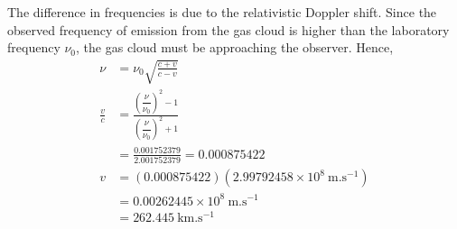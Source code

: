 The difference in frequencies is due to the relativistic Doppler shift. Since
the observed frequency of emission from the gas cloud is higher than the
laboratory frequency $\nu_0$, the gas cloud must be approaching the observer.
Hence,
\begin{align*}
\nu &= \nu_0 \sqrt{\frac{c+v}{c-v}}\\
\frac{v}{c} &= \frac{\left(\dfrac{\nu}{\nu_0}\right)^2 - 1}
                    {\left(\dfrac{\nu}{\nu_0}\right)^2 + 1}\\
&= \frac{0.001752379}{2.001752379} = 0.000875422\\
v &= \left(0.000875422\right)\left(2.99792458 \times 10^{8}~\mathrm{m.s^{-1}}\right)\\
&= 0.00262445 \times 10^{8}~\mathrm{m.s^{-1}}\\
&= 262.445~\mathrm{km.s^{-1}}
\end{align*}
